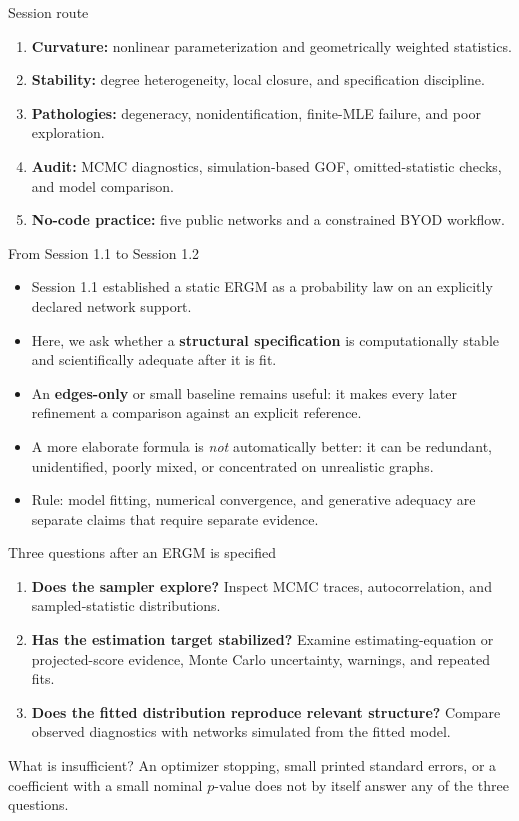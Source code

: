 \documentclass[aspectratio=169,11pt]{beamer}
\newcommand{\term}[1]{\textbf{\color{nupurple}#1}}
\begin{document}
\begin{frame}{Session route}
\begin{enumerate}
\item \term{Curvature:} nonlinear parameterization and geometrically weighted statistics.
\item \term{Stability:} degree heterogeneity, local closure, and specification discipline.
\item \term{Pathologies:} degeneracy, nonidentification, finite-MLE failure, and poor exploration.
\item \term{Audit:} MCMC diagnostics, simulation-based GOF, omitted-statistic checks, and model comparison.
\item \term{No-code practice:} five public networks and a constrained BYOD workflow.
\end{enumerate}
\end{frame}

\begin{frame}{From Session 1.1 to Session 1.2}
\begin{itemize}
\item Session 1.1 established a static ERGM as a probability law on an explicitly declared network support.
\item Here, we ask whether a \term{structural specification} is computationally stable and scientifically adequate after it is fit.
\item An \term{edges-only} or small baseline remains useful: it makes every later refinement a comparison against an explicit reference.
\item A more elaborate formula is \emph{not} automatically better: it can be redundant, unidentified, poorly mixed, or concentrated on unrealistic graphs.
\item \alert{Rule:} model fitting, numerical convergence, and generative adequacy are separate claims that require separate evidence.
\end{itemize}
\end{frame}

\begin{frame}{Three questions after an ERGM is specified}
\begin{enumerate}
\item \term{Does the sampler explore?} Inspect MCMC traces, autocorrelation, and sampled-statistic distributions.
\item \term{Has the estimation target stabilized?} Examine estimating-equation or projected-score evidence, Monte Carlo uncertainty, warnings, and repeated fits.
\item \term{Does the fitted distribution reproduce relevant structure?} Compare observed diagnostics with networks simulated from the fitted model.
\end{enumerate}
\begin{block}{What is insufficient?}
An optimizer stopping, small printed standard errors, or a coefficient with a small nominal $p$-value does not by itself answer any of the three questions.
\end{block}
\end{frame}
\end{document}
